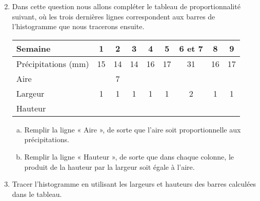 \documentclass[11pt]{article}
\begin{document}
\begin{exercice}
  \begin{enumerate}[(1)]
      \setcounter{enumi}{1}
    \item Dans cette question nous allons compléter le tableau de
      proportionnalité suivant, où les trois dernières lignes correspondent aux
      barres de l'histogramme que nous tracerons ensuite.

      \hspace{-1.5em}\begin{tabular}{p{7em}||c|c|c|c|c|c|c|c}
          Semaine & 1 & 2 & 3 & 4 & 5 & 6 et 7 & 8 & 9 \\
          \hline
          \hline
          Précipitations (mm) & 15 & 14 & 14 & 16 & 17 & 31 & 16 & 17 \\
          \hline
          \hline
          Aire &   & 7 & & & & &\\
          \hline
          Largeur & 1 & 1& 1& 1& 1& 2& 1& 1\\
          \hline
          Hauteur &&&&&&&
        \end{tabular}

      \begin{enumerate}[(a)]
        \item Remplir la ligne « Aire », de sorte que l'aire soit
          proportionnelle aux précipitations.
        \item Remplir la ligne « Hauteur », de sorte que dans chaque colonne, le produit de la hauteur par la largeur soit égale à l'aire.
      \end{enumerate}
    \item Tracer l'histogramme en utilisant les largeurs et hauteurs des barres calculées dans le tableau.
  \end{enumerate}
\end{exercice}
\end{document}
